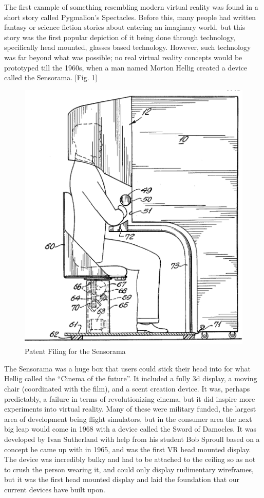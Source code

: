 \documentclass[a4paper,10pt,twoside]{article}
\begin{document}
	The first example of something resembling modern virtual reality was found in a short story called Pygmalion's Spectacles.  Before this, many people had written fantasy or science fiction stories about entering an imaginary world, but this story was the first popular depiction of it being done through technology, specifically head mounted, glasses based technology.  However, such technology was far beyond what was possible; no real virtual reality concepts would be prototyped till the 1960s, when a man named Morton Hellig created a device called the Sensorama. [Fig. 1]  
	\begin{figure}[H]
		\includegraphics[scale=0.4]{senso.png}
		\caption{Patent Filing for the Sensorama}
		\label{fig:sensorama}
	\end{figure}
	The Sensorama  was a huge box that users could stick their head into for what Hellig called the “Cinema of the future”.  It included a fully 3d display, a moving chair (coordinated with the film), and a scent creation device.  It was, perhaps predictably, a failure in terms of revolutionizing cinema, but it did inspire more experiments into virtual reality.  Many of these were military funded, the largest area of development being flight simulators, but in the consumer area the next big leap would come in 1968 with a device called the Sword of Damocles.  It was developed by Ivan Sutherland with help from his student Bob Sproull based on a concept he came up with in 1965, and was the first VR head mounted display.  The device was incredibly bulky and had to be attached to the ceiling so as not to crush the person wearing it, and could only display rudimentary wireframes, but it was the first head mounted display and laid the foundation that our current devices have built upon.  
\end{document}
